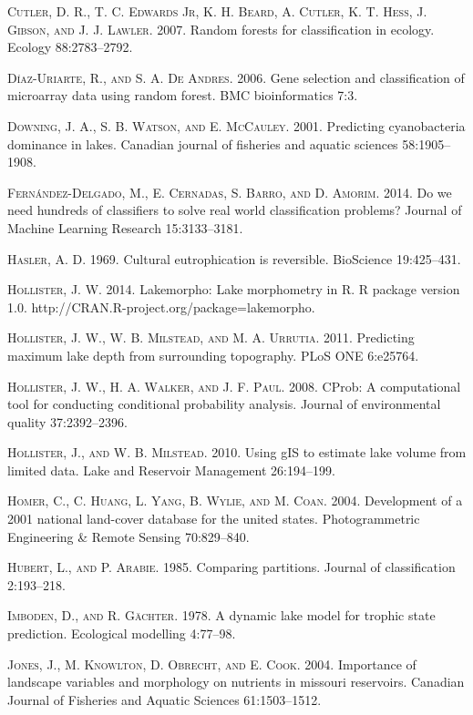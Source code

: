 \documentclass[11pt,]{article}
\begin{document}
\textsc{Cutler, D. R., T. C. Edwards Jr, K. H. Beard, A. Cutler, K. T.
Hess, J. Gibson, and J. J. Lawler}. 2007. Random forests for
classification in ecology. Ecology 88:2783--2792.

\textsc{D{í}az-Uriarte, R., and S. A. De Andres}. 2006. Gene selection
and classification of microarray data using random forest. BMC
bioinformatics 7:3.

\textsc{Downing, J. A., S. B. Watson, and E. McCauley}. 2001. Predicting
cyanobacteria dominance in lakes. Canadian journal of fisheries and
aquatic sciences 58:1905--1908.

\textsc{Fernández-Delgado, M., E. Cernadas, S. Barro, and D. Amorim}.
2014. Do we need hundreds of classifiers to solve real world
classification problems? Journal of Machine Learning Research
15:3133--3181.

\textsc{Hasler, A. D.} 1969. Cultural eutrophication is reversible.
BioScience 19:425--431.

\textsc{Hollister, J. W.} 2014. Lakemorpho: Lake morphometry in R. R
package version 1.0. http://CRAN.R-project.org/package=lakemorpho.

\textsc{Hollister, J. W., W. B. Milstead, and M. A. Urrutia}. 2011.
Predicting maximum lake depth from surrounding topography. PLoS ONE
6:e25764.

\textsc{Hollister, J. W., H. A. Walker, and J. F. Paul}. 2008. CProb: A
computational tool for conducting conditional probability analysis.
Journal of environmental quality 37:2392--2396.

\textsc{Hollister, J., and W. B. Milstead}. 2010. Using gIS to estimate
lake volume from limited data. Lake and Reservoir Management
26:194--199.

\textsc{Homer, C., C. Huang, L. Yang, B. Wylie, and M. Coan}. 2004.
Development of a 2001 national land-cover database for the united
states. Photogrammetric Engineering \& Remote Sensing 70:829--840.

\textsc{Hubert, L., and P. Arabie}. 1985. Comparing partitions. Journal
of classification 2:193--218.

\textsc{Imboden, D., and R. G{ä}chter}. 1978. A dynamic lake model for
trophic state prediction. Ecological modelling 4:77--98.

\textsc{Jones, J., M. Knowlton, D. Obrecht, and E. Cook}. 2004.
Importance of landscape variables and morphology on nutrients in
missouri reservoirs. Canadian Journal of Fisheries and Aquatic Sciences
61:1503--1512.
\end{document}
